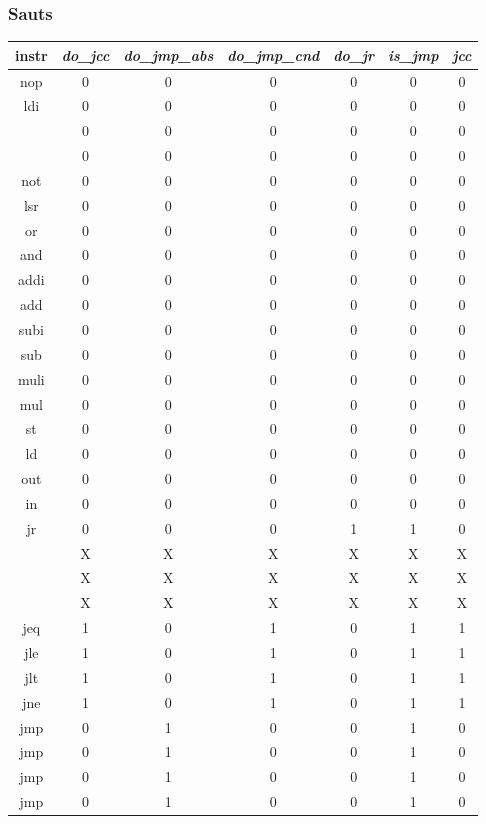 \documentclass[twoside, 12pt, a4paper]{article}
\begin{document}
\subsubsection{Sauts}

    \begin{center}
    	\begin{tabular}{|c|c|c|c|c|c|c|}
		\hline
		instr & \textit{do\_jcc} & \textit{do\_jmp\_abs} & \textit{do\_jmp\_cnd} &
\textit{do\_jr} & \textit{is\_jmp} & \textit{jcc}\\
            \hline
		nop		& 0 & 0 & 0 & 0 & 0 & 0 \\
		ldi		& 0 & 0 & 0 & 0 & 0 & 0 \\
				  & 0 & 0 & 0 & 0 & 0 & 0 \\
				  & 0 & 0 & 0 & 0 & 0 & 0 \\
		\hline
		not		& 0 & 0 & 0 & 0 & 0 & 0 \\
		lsr		& 0 & 0 & 0 & 0 & 0 & 0 \\
		or		& 0 & 0 & 0 & 0 & 0 & 0 \\
		and		& 0 & 0 & 0 & 0 & 0 & 0 \\
		\hline
		addi	& 0 & 0 & 0 & 0 & 0 & 0 \\
		add		& 0 & 0 & 0 & 0 & 0 & 0 \\
		subi	& 0 & 0 & 0 & 0 & 0 & 0 \\
		sub		& 0 & 0 & 0 & 0 & 0 & 0 \\
		\hline
		muli	& 0 & 0 & 0 & 0 & 0 & 0 \\
		mul		& 0 & 0 & 0 & 0 & 0 & 0 \\
		\hline
		st		& 0 & 0 & 0 & 0 & 0 & 0 \\
		ld		& 0 & 0 & 0 & 0 & 0 & 0 \\
		out		& 0 & 0 & 0 & 0 & 0 & 0 \\
		in		& 0 & 0 & 0 & 0 & 0 & 0 \\
		\hline 
		jr		& 0 & 0 & 0 & 1 & 1 & 0 \\
				  & X & X & X & X & X & X \\
				  & X & X & X & X & X & X \\
				  & X & X & X & X & X & X \\
		\hline
		jeq		& 1 & 0 & 1 & 0 & 1 & 1 \\
		jle		& 1 & 0 & 1 & 0 & 1 & 1 \\
		jlt		& 1 & 0 & 1 & 0 & 1 & 1 \\
		jne		& 1 & 0 & 1 & 0 & 1 & 1 \\
		\hline
		jmp		& 0 & 1 & 0 & 0 & 1 & 0 \\
		jmp		& 0 & 1 & 0 & 0 & 1 & 0 \\
		jmp		& 0 & 1 & 0 & 0 & 1 & 0 \\
		jmp		& 0 & 1 & 0 & 0 & 1 & 0 \\
		\hline
	\end{tabular}
\end{center}
\end{document}
